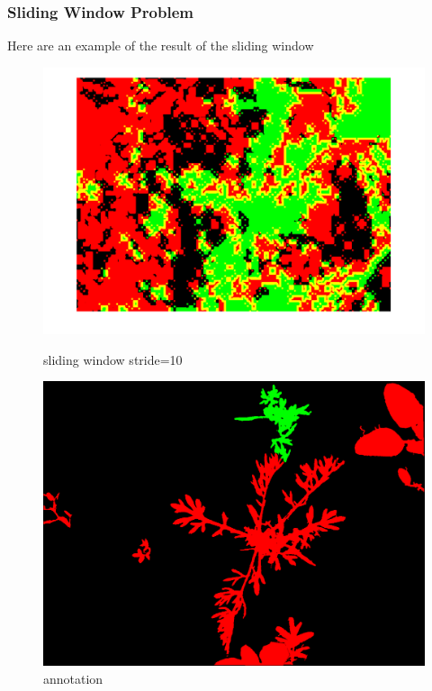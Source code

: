 \documentclass{beamer}
\begin{document}
\begin{frame}
\frametitle{Sliding Window Problem}

Here are an example of the result of the sliding window
\begin{figure}[!htb]
  \includegraphics[width=\linewidth]{stride10im1.png}
  \caption{sliding window stride=10}\label{fig: sliding window problem}
\endminipage\hfill
{}
  \includegraphics[width=\linewidth]{annotation.png}
  \caption{annotation}\label{fig:annotation}
\endminipage\hfill
\end{figure}
\newpage

\end{frame}
\end{document}
